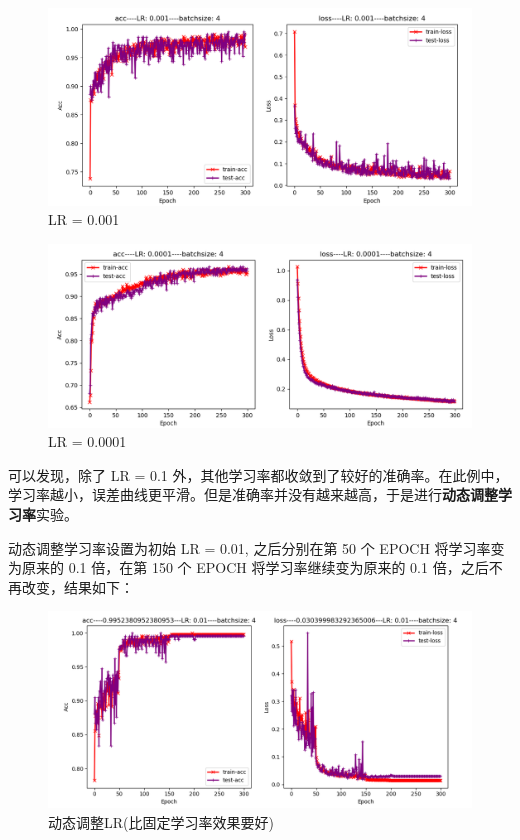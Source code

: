 \documentclass[12pt]{article}
\begin{document}
	\begin{figure}[H]
		\centering
		\includegraphics[width=4.7in]{./images/insects_normal_loss0001.png}
		\centering
		\caption{LR = 0.001}
	\end{figure}
	
	\begin{figure}[H]
		\centering
		\includegraphics[width=4.7in]{./images/insects_normal_loss00001.png}
		\centering
		\caption{LR = 0.0001}
	\end{figure}
	
	可以发现，除了 LR = 0.1 外，其他学习率都收敛到了较好的准确率。在此例中，学习率越小，误差曲线更平滑。但是准确率并没有越来越高，于是进行\textbf{动态调整学习率}实验。
	
	动态调整学习率设置为初始 LR = 0.01, 之后分别在第 50 个 EPOCH 将学习率变为原来的 0.1 倍，在第 150 个 EPOCH 将学习率继续变为原来的 0.1 倍，之后不再改变，结果如下：
	
	\begin{figure}[H]
		\centering
		\includegraphics[width=4.5in]{./images/insects_normal_loss_step.png}
		\centering
		\caption{动态调整LR(比固定学习率效果要好)}
	\end{figure}
	
\end{document}
